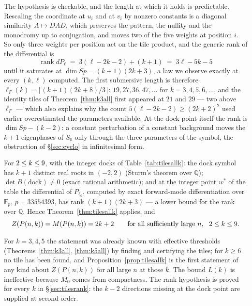 \begin{remark}\label{rem:threeperpos}
The hypothesis is checkable, and the length at which it holds is predictable.
Rescaling the coordinate at $u_i$ and at $v_i$ by nonzero constants is a
diagonal similarity $A\mapsto DAD$, which preserves the pattern, the nullity
and the monodromy up to conjugation, and moves two of the five weights at
position $i$. So only three weights per position act on the tile product, and
the generic rank of the differential is
\[
  \operatorname{rank}dP_\ell \;=\; 3(\ell-2k-2)+(k+1) \;=\; 3\ell-5k-5
\]
until it saturates at $\dim Sp=(k+1)(2k+3)$, a law we observe exactly at every
$(k,\ell)$ computed. The first submersive length is therefore
$\ell_F(k)=\lceil(k+1)(2k+8)/3\rceil$: $19,27,36,47,\dots$ for $k=3,4,5,6,\dots$,
and the identity tiles of Theorem~\ref{thm:k3all} first appeared at $21$ and
$29$ --- two above $\ell_F$ --- which also explains why the count
$5(\ell-2k-2)\ge(2k+2)^2$ used earlier overestimated the parameters available.
At the dock point itself the rank is $\dim Sp-(k-2)$: a constant perturbation of
a constant background moves the $k+1$ eigenphases of $S_0$ only through the
three parameters of the symbol, the obstruction of \S\ref{sec:cyclo} in
infinitesimal form.
\end{remark}

\begin{proposition}\label{prop:tilesallk}
For $2\le k\le9$, with the integer docks of
Table~\ref{tab:tilesallk}: the dock symbol has $k+1$ distinct real roots in
$(-2,2)$ (Sturm's theorem over $\mathbb Q$); $\det B(\mathrm{dock})\ne0$ (exact
rational arithmetic); and at the integer point $w^*$ of the table the
differential of $P_{\ell_0}$, computed by exact forward-mode differentiation
over $\mathbb F_p$, $p=33554393$, has rank $(k+1)(2k+3)$ --- a lower bound for
the rank over $\mathbb Q$. Hence Theorem~\ref{thm:tilesallk} applies, and
\[
  Z(P(n,k))=M(P(n,k))=2k+2\qquad\text{for all sufficiently large }n,\ \ 2\le k\le9 .
\]
\end{proposition}

\begin{table}[ht]\centering\small

\caption{The docks and lengths at which the hypothesis of
Theorem~\ref{thm:tilesallk} is certified. Generated by
\texttt{verification/verify\_all.py}.}
\label{tab:tilesallk}
\end{table}

\begin{remark}
For $k=3,4,5$ the statement was already known with effective thresholds
(Theorems~\ref{thm:k3all}, \ref{thm:k5all}) by finding and certifying the
tiles; for $k\ge6$ no tile has been found, and Proposition~\ref{prop:tilesallk}
is the first statement of any kind about $Z(P(n,k))$ for all large $n$ at those
$k$. The bound $L(k)$ is ineffective because $M_0$ comes from compactness.
The rank hypothesis is proved for every $k$ in \S\ref{sec:tilesrank}: the
$k-2$ directions missing at the dock point are supplied at second order.
\end{remark}
